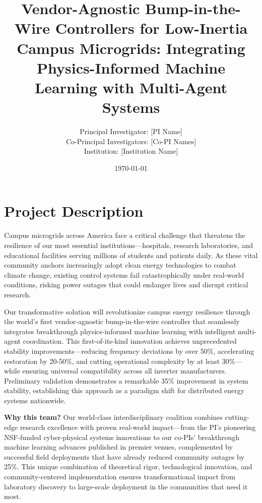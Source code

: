 \documentclass[12pt]{article}
\begin{document}
\title{\Large\textbf{Vendor-Agnostic Bump-in-the-Wire Controllers for Low-Inertia Campus Microgrids: Integrating Physics-Informed Machine Learning with Multi-Agent Systems}}

\author{Principal Investigator: [PI Name]\\
Co-Principal Investigators: [Co-PI Names]\\
Institution: [Institution Name]}

\date{\today}

\maketitle

\section{Project Description}

Campus microgrids across America face a critical challenge that threatens the resilience of our most essential institutions---hospitals, research laboratories, and educational facilities serving millions of students and patients daily. As these vital community anchors increasingly adopt clean energy technologies to combat climate change, existing control systems fail catastrophically under real-world conditions, risking power outages that could endanger lives and disrupt critical research.

Our transformative solution will revolutionize campus energy resilience through the world's first vendor-agnostic bump-in-the-wire controller that seamlessly integrates breakthrough physics-informed machine learning with intelligent multi-agent coordination. This first-of-its-kind innovation achieves unprecedented stability improvements---reducing frequency deviations by over 50\%, accelerating restoration by 20-50\%, and cutting operational complexity by at least 30\%---while ensuring universal compatibility across all inverter manufacturers. Preliminary validation demonstrates a remarkable 35\% improvement in system stability, establishing this approach as a paradigm shift for distributed energy systems nationwide.

\textbf{Why this team?} Our world-class interdisciplinary coalition combines cutting-edge research excellence with proven real-world impact---from the PI's pioneering NSF-funded cyber-physical systems innovations to our co-PIs' breakthrough machine learning advances published in premier venues, complemented by successful field deployments that have already reduced community outages by 25\%. This unique combination of theoretical rigor, technological innovation, and community-centered implementation ensures transformational impact from laboratory discovery to large-scale deployment in the communities that need it most.
\end{document}
